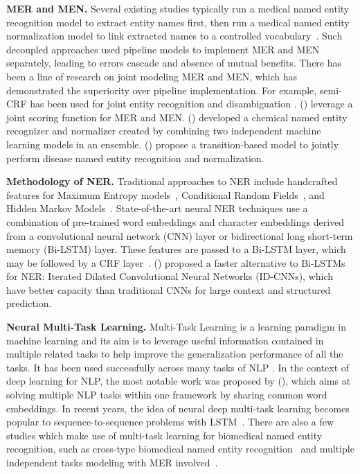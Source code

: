 \textbf{MER and MEN.} 
Several existing studies typically run a medical named entity recognition model to extract entity names first, then run a medical named entity normalization model to link extracted names to a controlled vocabulary~\cite{Doan2010,Sahu2016}.
Such decoupled approaches used pipeline models to implement MER and MEN separately, leading to errors cascade and absence of mutual benefits. 
There has been a line of research on joint modeling MER and MEN, which has demonstrated the superiority over pipeline implementation. 
For example, semi-CRF has been used for joint entity recognition and disambiguation \cite{Luo2015Joint}. \citeauthor{Leaman2016TaggerOne} (\citeyear{Leaman2016TaggerOne}) leverage a joint scoring function for MER and MEN. \citeauthor{Leaman2015tmChem} (\citeyear{Leaman2015tmChem}) developed a chemical named entity recognizer and normalizer created by combining two independent machine learning models in an ensemble. \citeauthor{Lou2017A} (\citeyear{Lou2017A}) propose a transition-based model to jointly perform disease named entity recognition and normalization. 

\textbf{Methodology of NER.}
Traditional approaches to NER include handcrafted features for Maximum Entropy models~\cite{Curran-Clark:2003:CONLL}, Conditional Random
Fields~\cite{McCallum-Li:2003:CONLL}, and Hidden Markov Models~\cite{Klein-etAl:2003:CONLL}.
State-of-the-art neural NER techniques use a combination of pre-trained word embeddings and character embeddings derived from a convolutional neural network (CNN) layer or bidirectional long short-term memory (Bi-LSTM) layer. These features are passed to a Bi-LSTM layer, which may be followed by a CRF layer~\cite{lample-EtAl:2016:N16-1,MaH16,TACL792}. \citeauthor{strubell-EtAl:2017:EMNLP2017} (\citeyear{strubell-EtAl:2017:EMNLP2017}) proposed a faster alternative
to Bi-LSTMs for NER: Iterated Dilated Convolutional Neural Networks (ID-CNNs), which have better capacity than traditional CNNs for large context and structured prediction.

\textbf{Neural Multi-Task Learning.} 
Multi-Task Learning  is a learning paradigm in machine learning and its aim is to leverage useful information
contained in multiple related tasks to help improve the generalization performance of all the tasks. It has been used successfully across many tasks of NLP \cite{Collobert2011}. 
In the context of deep learning for NLP, the most notable work was proposed by \citeauthor{CollobertW08} (\citeyear{CollobertW08}), which aims at solving multiple NLP tasks within one framework by sharing common word embeddings.
In recent years, the idea of neural deep multi-task learning becomes popular to sequence-to-sequence problems with LSTM~\cite{DongWHYW15,luong2016iclr_multi,Liuyang2016,AugensteinS17}. There are also a few studies which make use of multi-task learning for biomedical named entity recognition, such as cross-type biomedical named entity recognition~\cite{DBLP:journals/corr/abs-1801-09851} and multiple independent tasks modeling with MER involved~\cite{Crichton2017A}. 

